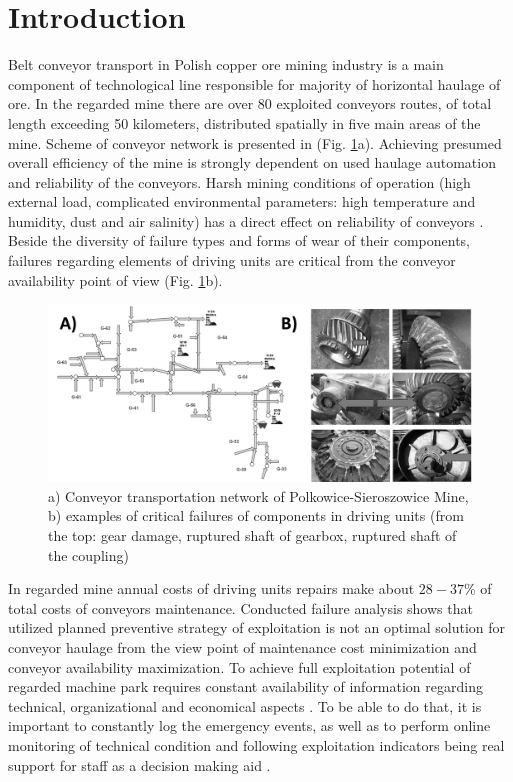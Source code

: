 \section{Introduction}
Belt conveyor transport in Polish copper ore mining industry is a main component of technological line responsible for majority of horizontal haulage of ore. 
In the regarded mine there are over 80 exploited conveyors routes, of total length exceeding 50 kilometers, distributed spatially in five main areas of the mine. Scheme of conveyor network is presented in (Fig. \ref{fig: f1}a). Achieving presumed overall efficiency of the mine is strongly dependent on used haulage automation and reliability of the conveyors. Harsh mining conditions of operation (high external load, complicated environmental parameters: high temperature and humidity, dust and air salinity) has a direct effect on  reliability of conveyors \cite{Kacprzak2011}. Beside the diversity of failure types and forms of wear of their components, failures regarding elements of driving units are critical from the conveyor availability point of view (Fig. \ref{fig: f1}b).
\begin{figure}[ht!]
\centering
\includegraphics[width = \textwidth]{Wykresy/Fig_1}
\caption{a) Conveyor transportation network of Polkowice-Sieroszowice Mine, b) examples of critical failures of components in driving units (from the top: gear damage, ruptured shaft of gearbox, ruptured shaft of the coupling)}
\label{fig: f1}
\end{figure}
In regarded mine annual costs of driving units repairs make about $28-37$\%  of total costs of conveyors  maintenance. Conducted failure analysis \cite{Zimroz2009} shows that utilized planned preventive strategy of exploitation is not an optimal solution for conveyor haulage from the view point of maintenance cost minimization and conveyor availability maximization. To achieve full exploitation potential of regarded machine park requires constant availability of information regarding technical, organizational and economical aspects \cite{Levitt2009,Lodewijks2004,Loska2013,Loska2012}. To be able to do that, it is important to constantly log the emergency events, as well as to perform online monitoring of technical condition and following exploitation indicators being real support for staff as a decision making aid \cite{Dabrowski2015,Drozyner2007,Galar2012,Kazmierczak1998}.
